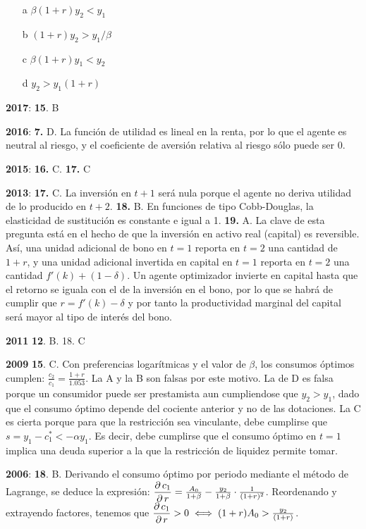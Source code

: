 \documentclass{nuevotema}
\begin{document}
\begin{enumerate}
    \item[a] $\beta (1+r) y_2 < y_1$
    \item[b] $(1+r)y_2 > y_1 / \beta$
    \item[c] $\beta(1+r)y_1 < y_2$
    \item[d] $y_2 > y_1 (1+r)$
\end{enumerate}

\notas

\textbf{2017}: \textbf{15}. B

\textbf{2016}: \textbf{7.} D. La función de utilidad es lineal en la renta, por lo que el agente es neutral al riesgo, y el coeficiente de aversión relativa al riesgo sólo puede ser 0.

\textbf{2015}: \textbf{16.} C. \textbf{17.} C

\textbf{2013}: \textbf{17.} C. La inversión en $t+1$ será nula porque el agente no deriva utilidad de lo producido en $t+2$. \textbf{18.} B. En funciones de tipo Cobb-Douglas, la elasticidad de sustitución es constante e igual a 1. \textbf{19.} A. La clave de esta pregunta está en el hecho de que la inversión en activo real (capital) es reversible. Así, una unidad adicional de bono en $t=1$ reporta en $t=2$ una cantidad de $1+r$, y una unidad adicional invertida en capital en $t=1$ reporta en $t=2$ una cantidad $f'(k) + (1-\delta)$. Un agente optimizador invierte en capital hasta que el retorno se iguala con el de la inversión en el bono, por lo que se habrá de cumplir que $r = f'(k) - \delta$ y por tanto la productividad marginal del capital será mayor al tipo de interés del bono.

\textbf{2011} \textbf{12}. B. 18. C

\textbf{2009} \textbf{15}. C. Con preferencias logarítmicas y el valor de $\beta$, los consumos óptimos cumplen: $\frac{c_2}{c_1} = \frac{1+r}{1.053}$. La A y la B son falsas por este motivo. La de D es falsa porque un consumidor puede ser prestamista aun cumpliendose que $y_2 > y_1$, dado que el consumo óptimo depende del cociente anterior y no de las dotaciones. La C es cierta porque para que la restricción sea vinculante, debe cumplirse que $s = y_1 - c_1^* < -\alpha y_1$. Es decir, debe cumplirse que el consumo óptimo en $t=1$ implica una deuda superior a la que la restricción de liquidez permite tomar.

\textbf{2006}: \textbf{18}. B. Derivando el consumo óptimo por periodo mediante el método de Lagrange, se deduce la expresión: $\dfrac{\partial \, c_1}{\partial \, r} = \frac{A_0}{1+\beta} - \frac{y_2}{1+\beta}\cdot \frac{1}{(1+r)^2}$. Reordenando y extrayendo factores, tenemos que $\dfrac{\partial \, c_1}{\partial \, r} > 0 \iff (1+r)A_0 > \frac{y_2}{(1+r)}$.
\end{document}
